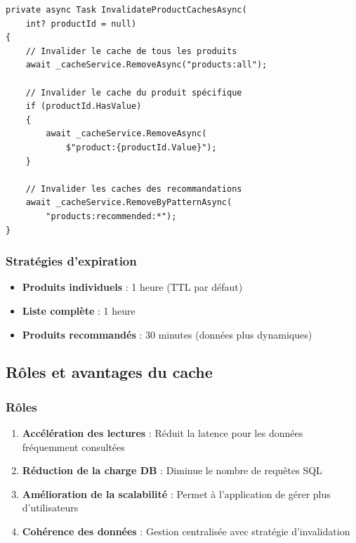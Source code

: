 \documentclass[12pt,a4paper]{article}
\begin{document}
\begin{lstlisting}[caption=Invalidation du cache, float=h!]
private async Task InvalidateProductCachesAsync(
    int? productId = null)
{
    // Invalider le cache de tous les produits
    await _cacheService.RemoveAsync("products:all");

    // Invalider le cache du produit spécifique
    if (productId.HasValue)
    {
        await _cacheService.RemoveAsync(
            $"product:{productId.Value}");
    }

    // Invalider les caches des recommandations
    await _cacheService.RemoveByPatternAsync(
        "products:recommended:*");
}
\end{lstlisting}

\subsubsection{Stratégies d'expiration}

\begin{itemize}
    \item \textbf{Produits individuels} : 1 heure (TTL par défaut)
    \item \textbf{Liste complète} : 1 heure
    \item \textbf{Produits recommandés} : 30 minutes (données plus dynamiques)
\end{itemize}

\subsection{Rôles et avantages du cache}

\subsubsection{Rôles}

\begin{enumerate}
    \item \textbf{Accélération des lectures} : Réduit la latence pour les données fréquemment consultées
    \item \textbf{Réduction de la charge DB} : Diminue le nombre de requêtes SQL
    \item \textbf{Amélioration de la scalabilité} : Permet à l'application de gérer plus d'utilisateurs
    \item \textbf{Cohérence des données} : Gestion centralisée avec stratégie d'invalidation
\end{enumerate}
\end{document}
